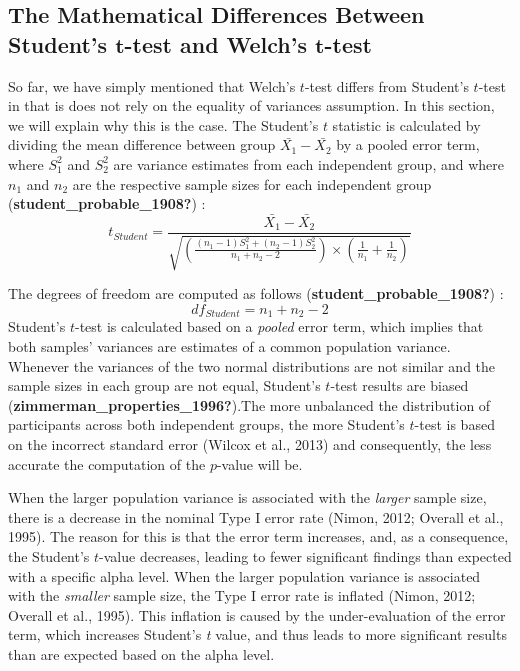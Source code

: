 \documentclass[
  english,
  man]{apa6}
\begin{document}
\hypertarget{the-mathematical-differences-between-students-bmt-test-and-welchs-bmt-test}{%
\subsection{\texorpdfstring{The Mathematical Differences Between Student's \(\bm{t}\)-test and Welch's \(\bm{t}\)-test}{The Mathematical Differences Between Student's \textbackslash bm\{t\}-test and Welch's \textbackslash bm\{t\}-test}}\label{the-mathematical-differences-between-students-bmt-test-and-welchs-bmt-test}}

So far, we have simply mentioned that Welch's \(t\)-test differs from Student's \(t\)-test in that is does not rely on the equality of variances assumption. In this section, we will explain why this is the case. The Student's \(t\) statistic is calculated by dividing the mean difference between group \(\bar{X_1}-\bar{X_2}\) by a pooled error term, where \(S^2_1\) and \(S^2_2\) are variance estimates from each independent group, and where \(n_1\) and \(n_2\) are the respective sample sizes for each independent group (\textbf{student\_probable\_1908?}) :
\begin{equation*} 
t_{Student}=\frac{\bar{X_1}-\bar{X_2}}{\sqrt{ \left(\frac{(n_1-1)S^2_1+(n_2-1)S^2_2}{n_1+n_2-2}\right) \times \left(\frac{1}{n_1}+\frac{1}{n_2}\right)}}
\label{eqn:Student}
\end{equation*}

The degrees of freedom are computed as follows (\textbf{student\_probable\_1908?}) :
\begin{equation*} 
df_{Student}=n_1+n_2-2
\label{eqn:dfStudent}
\end{equation*}
Student's \(t\)-test is calculated based on a \emph{pooled} error term, which implies that both samples' variances are estimates of a common population variance. Whenever the variances of the two normal distributions are not similar and the sample sizes in each group are not equal, Student's \(t\)-test results are biased (\textbf{zimmerman\_properties\_1996?}).The more unbalanced the distribution of participants across both independent groups, the more Student's \(t\)-test is based on the incorrect standard
error (Wilcox et al., 2013) and consequently, the less accurate the computation of the \(p\)-value will be.

When the larger population variance is associated with the \emph{larger} sample size, there is a decrease in the nominal Type I error rate (Nimon, 2012; Overall et al., 1995). The reason for this is that the error term increases, and, as a consequence, the Student's \(t\)-value decreases, leading to fewer significant findings than expected with a specific alpha level. When the larger population variance is associated with the \emph{smaller} sample size, the Type I error rate is inflated (Nimon, 2012; Overall et al., 1995). This inflation is caused by the under-evaluation of the error term, which increases Student's \emph{t} value, and thus leads to more significant results than are expected based on the alpha level.
\end{document}
